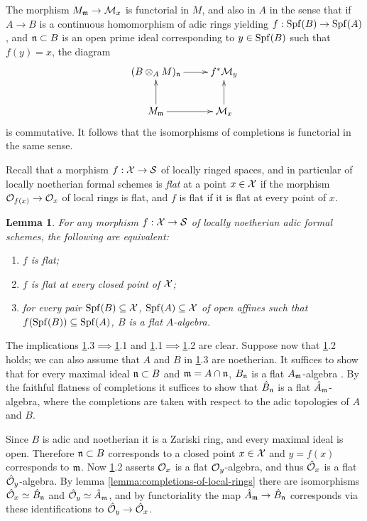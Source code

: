 \documentclass{article}
\theoremstyle{change}
\newtheorem{lemma}[subsubsection]{Lemma}
\numberwithin{equation}{subsubsection}
\newcommand{\demobox}{\vrule height6pt width6pt depth0pt}
\newenvironment{demo}{\noindent{\it Proof.}}
{{\unskip\nobreak\hfil\qquad
\demobox\parfillskip=0pt\par}
\medskip}
\begin{document}
The morphism $M_{\mathfrak m}\to{\cal M}_x$ is functorial in $M$, and also in $A$ in
the sense that if $A\to B$ is a continuous homomorphism of adic rings
yielding $f:{\operatorname{Spf}({B})}\to{\operatorname{Spf}({A})}$, and ${\mathfrak n}\subset B$ is an open prime
ideal corresponding to $y\in{\operatorname{Spf}({B})}$ such that $f(y)=x$, the diagram
\begin{displaymath}
  \xymatrix{
    (B\tens_AM)_\fn\ar[r]&f^*\cM_y\\
    M_\fm\ar[r]\ar[u]&\cM_x\ar[u]
  }
\end{displaymath}
is commutative. It follows that the isomorphisms of completions is
functorial in the same sense.

Recall that a morphism $f:{\cal X}\to{\cal S}$ of locally ringed spaces, and in
particular of locally noetherian formal schemes is \textit{flat} at a
point $x\in{\cal X}$ if the morphism ${\cal O}_{f(x)}\to{\cal O}_x$ of local rings is
flat, and $f$ is flat if it is flat at every point of $x$.

\begin{lemma}\label{lemma:formal-flatness}
  For any morphism $f:{\cal X}\to{\cal S}$ of locally noetherian adic formal
  schemes, the following are equivalent:
  \begin{enumerate}
  \item $f$ is flat;
  \item $f$ is flat at every closed point of ${\cal X}$;
  \item for every pair ${\operatorname{Spf}({B})}\subseteq{\cal X}$, ${\operatorname{Spf}({A})}\subseteq{\cal X}$ of open
    affines such that $f({\operatorname{Spf}({B})})\subseteq{\operatorname{Spf}({A})}$, $B$ is a flat
    $A$-algebra.
  \end{enumerate}
\end{lemma}
\begin{demo}
  The implications
  \ref{lemma:formal-flatness}.3$\implies$\ref{lemma:formal-flatness}.1
  and
  \ref{lemma:formal-flatness}.1$\implies$\ref{lemma:formal-flatness}.2
  are clear. Suppose now that \ref{lemma:formal-flatness}.2 holds; we
  can also assume that $A$ and $B$ in \ref{lemma:formal-flatness}.3
  are noetherian. It suffices to show that for every maximal ideal
  ${\mathfrak n}\subset B$ and ${\mathfrak m}=A\cap{\mathfrak n}$, $B_{\mathfrak n}$ is a flat $A_{\mathfrak m}$-algebra
  \cite[Ch. II \S3 no. 4 Prop. 15]{bourbaki-AC}. By the faithful
  flatness of completions it suffices to show that $\hat B_{\mathfrak n}$ is a
  flat $\hat A_{\mathfrak m}$-algebra, where the completions are taken with
  respect to the adic topologies of $A$ and $B$.

  Since $B$ is adic and noetherian it is a Zariski ring, and every
  maximal ideal is open. Therefore ${\mathfrak n}\subset B$ corresponds to a
  closed point $x\in{\cal X}$ and $y=f(x)$ corresponds to ${\mathfrak m}$. Now
  \ref{lemma:formal-flatness}.2 asserts ${\cal O}_x$ is a flat
  ${\cal O}_y$-algebra, and thus $\hat{{\cal O}}_x$ is a flat $\hat{{\cal O}}_y$-algebra. By
  lemma \ref{lemma:completions-of-local-rings} there are isomorphisms
  $\hat{{\cal O}}_x\simeq\hat B_{\mathfrak n}$ and $\hat{{\cal O}}_y\simeq\hat A_{\mathfrak m}$, and by
  functoriality the map $\hat A_{\mathfrak m}\to\hat B_{\mathfrak n}$ corresponds via
  these identifications to $\hat{{\cal O}}_y\to\hat{{\cal O}}_x$.
\end{demo}
\end{document}
